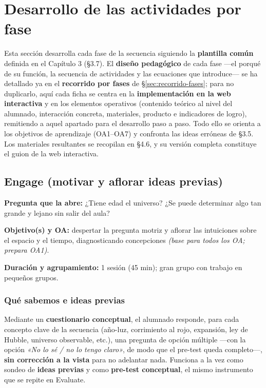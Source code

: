 \section{Desarrollo de las actividades por fase}\label{sec:desarrollo-detallado}

Esta sección desarrolla cada fase de la secuencia siguiendo la \textbf{plantilla común} definida en el Capítulo 3 (§3.7). El \textbf{diseño pedagógico} de cada fase ---el porqué de su función, la secuencia de actividades y las ecuaciones que introduce--- se ha detallado ya en el \textbf{recorrido por fases} de §\ref{sec:recorrido-fases}; para no duplicarlo, aquí cada ficha se centra en la \textbf{implementación en la web interactiva} y en los elementos operativos (contenido teórico al nivel del alumnado, interacción concreta, materiales, producto e indicadores de logro), remitiendo a aquel apartado para el desarrollo paso a paso. Todo ello se orienta a los objetivos de aprendizaje (OA1--OA7) y confronta las ideas erróneas de §3.5. Los materiales resultantes se recopilan en §4.6, y su versión completa constituye el guion de la web interactiva.

\subsection{Engage (motivar y aflorar ideas previas)}

\textbf{Pregunta que la abre:} ¿Tiene edad el universo? ¿Se puede determinar algo tan grande y lejano sin salir del aula?

\textbf{Objetivo(s) y OA:} despertar la pregunta motriz y aflorar las intuiciones sobre el espacio y el tiempo, diagnosticando concepciones \textit{(base para todos los OA; prepara OA1)}.

\textbf{Duración y agrupamiento:} 1 sesión (45 min); gran grupo con trabajo en pequeños grupos.

\subsubsection*{Qué sabemos e ideas previas}

Mediante un \textbf{cuestionario conceptual}, el alumnado responde, para cada concepto clave de la secuencia (año-luz, corrimiento al rojo, expansión, ley de Hubble, universo observable, etc.), una pregunta de opción múltiple ---con la opción \emph{«No lo sé / no lo tengo claro»}, de modo que el pre-test queda completo---, \textbf{sin corrección a la vista} para no adelantar nada. Funciona a la vez como sondeo de \textbf{ideas previas} y como \textbf{pre-test conceptual}, el mismo instrumento que se repite en Evaluate.


